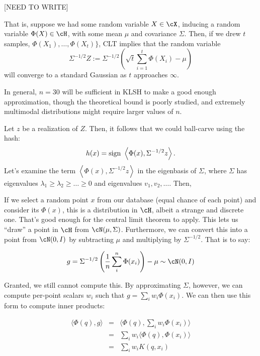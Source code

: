 \documentclass[twoside,11pt]{homework}
\begin{document}
[NEED TO WRITE]

That is, suppose we had some random variable $X \in \cX$, inducing a random variable $\Phi(X) \in \cH$, with some mean $\mu$ and covariance $\Sigma$. Then, if we drew $t$ samples, $\Phi(X_1),\dotsc, \Phi(X_t)\}$, CLT implies that the random variable
\[\Sigma^{-1/2} Z := \Sigma^{-1/2} \left(\sqrt{t} \sum_{i=1}^t \Phi(X_i) - \mu\right)\]
will converge to a standard Gaussian as $t$ approaches $\infty$.





In general,
$n=30$ will be sufficient in KLSH to make a good enough approximation, though the
theoretical bound is poorly studied, and extremely multimodal
distributions might require larger values of $n$.




Let $z$ be a realization of $Z$. Then, it follows that we could ball-carve using the hash:
\[h(x) = \operatorname{sign} \ \left\langle \Phi(x), \Sigma^{-1/2}z\right\rangle.\]
Let's examine the term $\left\langle \Phi(x), \Sigma^{-1/2}z\right\rangle$ in the eigenbasis of $\Sigma$, where $\Sigma$ has eigenvalues $\lambda_1 \geq \lambda_2\geq \dotsc \geq 0$ and eigenvalues $v_1,v_2,\dotsc$. Then, 






If we select a random point $x$ from our database (equal chance of
each point) and consider its $\Phi(x)$, this is a distribution in
$\cH$, albeit a strange and discrete one.  That's good enough for the
central limit theorem to apply.  This lets us ``draw'' a point in
$\cH$ from $\cN(\mu,\Sigma)$.  Furthermore, we can convert this into a
point from $\cN(0,I)$ by subtracting $\mu$ and multiplying by
$\Sigma^{-1/2}$.  That is to say:

\begin{equation*}
  g = \Sigma^{-1/2}\left(\frac{1}{n}\sum_i^n \Phi(x_i) \right) - \mu  \sim \cN(0,I)
\end{equation*}

Granted, we still cannot compute this.  By approximating $\Sigma$,
however, we can compute per-point scalars $w_i$ such that $g=\sum_i
w_i\Phi(x_i)$.  We can then use this form to compute
inner products:

\begin{eqnarray*}
  \langle \Phi(q), g \rangle
  & = & \langle \Phi(q), \sum_i w_i\Phi(x_i) \rangle \\
  & = & \sum_i w_i \langle \Phi(q), \Phi(x_i) \rangle \\
  & = & \sum_i w_i K(q, x_i) \\
\end{eqnarray*}
\end{document}
